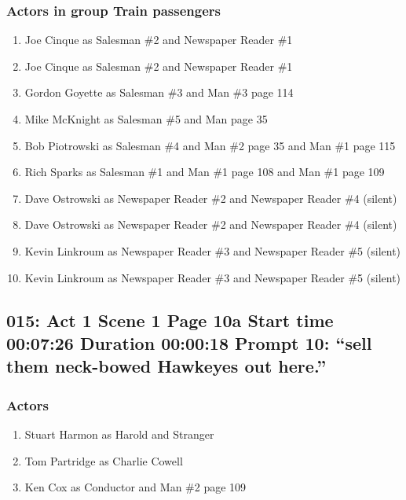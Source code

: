 \subsubsection{Actors in group Train passengers}
\begin{enumerate}
\item Joe Cinque as Salesman \#2 and Newspaper Reader \#1
\item Joe Cinque as Salesman \#2 and Newspaper Reader \#1
\item Gordon Goyette as Salesman \#3 and Man \#3 page 114
\item Mike McKnight as Salesman \#5 and Man page 35
\item Bob Piotrowski as Salesman \#4 and Man \#2 page 35 and Man \#1 page 115
\item Rich Sparks as Salesman \#1 and Man \#1 page 108 and Man \#1 page 109
\item Dave Ostrowski as Newspaper Reader \#2 and Newspaper Reader \#4 (silent)
\item Dave Ostrowski as Newspaper Reader \#2 and Newspaper Reader \#4 (silent)
\item Kevin Linkroum as Newspaper Reader \#3 and Newspaper Reader \#5 (silent)
\item Kevin Linkroum as Newspaper Reader \#3 and Newspaper Reader \#5 (silent)
\end{enumerate}


\subsection{015: Act 1 Scene 1 Page 10a Start time 00:07:26 Duration 00:00:18 Prompt 10: ``sell them neck-bowed Hawkeyes out here.''}

\subsubsection{Actors}
\begin{enumerate}
\item Stuart Harmon as Harold and Stranger
\item Tom Partridge as Charlie Cowell
\item Ken Cox as Conductor and Man \#2 page 109
\end{enumerate}
